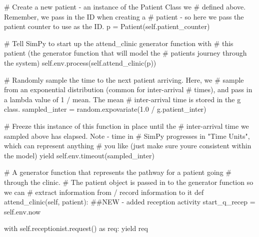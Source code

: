 \documentclass[
  letterpaper,
  DIV=11,
  numbers=noendperiod]{scrreprt}
\newenvironment{Shaded}{\begin{snugshade}}{\end{snugshade}}
\newcommand{\CommentTok}[1]{\textcolor[rgb]{0.37,0.37,0.37}{#1}}
\newcommand{\ControlFlowTok}[1]{\textcolor[rgb]{0.00,0.23,0.31}{#1}}
\newcommand{\FloatTok}[1]{\textcolor[rgb]{0.68,0.00,0.00}{#1}}
\newcommand{\ImportTok}[1]{\textcolor[rgb]{0.00,0.46,0.62}{#1}}
\newcommand{\KeywordTok}[1]{\textcolor[rgb]{0.00,0.23,0.31}{#1}}
\newcommand{\NormalTok}[1]{\textcolor[rgb]{0.00,0.23,0.31}{#1}}
\newcommand{\OperatorTok}[1]{\textcolor[rgb]{0.37,0.37,0.37}{#1}}
\newcommand{\VariableTok}[1]{\textcolor[rgb]{0.07,0.07,0.07}{#1}}
\begin{document}
\begin{tcolorbox}
\begin{Shaded}
\begin{Highlighting}[]
            \CommentTok{\# Create a new patient {-} an instance of the Patient Class we}
            \CommentTok{\# defined above.  Remember, we pass in the ID when creating a}
            \CommentTok{\# patient {-} so here we pass the patient counter to use as the ID.}
\NormalTok{            p }\OperatorTok{=}\NormalTok{ Patient(}\VariableTok{self}\NormalTok{.patient\_counter)}

            \CommentTok{\# Tell SimPy to start up the attend\_clinic generator function with}
            \CommentTok{\# this patient (the generator function that will model the}
            \CommentTok{\# patient\textquotesingle{}s journey through the system)}
            \VariableTok{self}\NormalTok{.env.process(}\VariableTok{self}\NormalTok{.attend\_clinic(p))}

            \CommentTok{\# Randomly sample the time to the next patient arriving.  Here, we}
            \CommentTok{\# sample from an exponential distribution (common for inter{-}arrival}
            \CommentTok{\# times), and pass in a lambda value of 1 / mean.  The mean}
            \CommentTok{\# inter{-}arrival time is stored in the g class.}
\NormalTok{            sampled\_inter }\OperatorTok{=}\NormalTok{ random.expovariate(}\FloatTok{1.0} \OperatorTok{/}\NormalTok{ g.patient\_inter)}

            \CommentTok{\# Freeze this instance of this function in place until the}
            \CommentTok{\# inter{-}arrival time we sampled above has elapsed.  Note {-} time in}
            \CommentTok{\# SimPy progresses in "Time Units", which can represent anything}
            \CommentTok{\# you like (just make sure you\textquotesingle{}re consistent within the model)}
            \ControlFlowTok{yield} \VariableTok{self}\NormalTok{.env.timeout(sampled\_inter)}

    \CommentTok{\# A generator function that represents the pathway for a patient going}
    \CommentTok{\# through the clinic.}
    \CommentTok{\# The patient object is passed in to the generator function so we can}
    \CommentTok{\# extract information from / record information to it}
    \KeywordTok{def}\NormalTok{ attend\_clinic(}\VariableTok{self}\NormalTok{, patient):}
        \CommentTok{\#\#NEW {-} added reception activity}
\NormalTok{        start\_q\_recep }\OperatorTok{=} \VariableTok{self}\NormalTok{.env.now}

        \ControlFlowTok{with} \VariableTok{self}\NormalTok{.receptionist.request() }\ImportTok{as}\NormalTok{ req:}
            \ControlFlowTok{yield}\NormalTok{ req}


\end{Highlighting}
\end{Shaded}
\end{tcolorbox}
\end{document}
